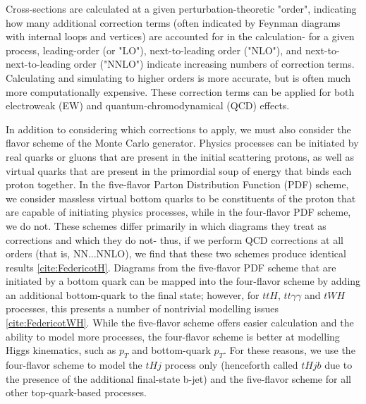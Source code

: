 Cross-sections are calculated at a given perturbation-theoretic "order", indicating how many additional correction terms (often indicated by Feynman diagrams with internal loops and vertices) are accounted for in the calculation- for a given process, leading-order (or "LO"), next-to-leading order ("NLO"), and next-to-next-to-leading order ("NNLO") indicate increasing numbers of correction terms. Calculating and simulating to higher orders is more accurate, but is often much more computationally expensive. These correction terms can be applied for both electroweak (EW) and quantum-chromodynamical (QCD) effects.

In addition to considering which corrections to apply, we must also consider the flavor scheme of the Monte Carlo generator. Physics processes can be initiated by real quarks or gluons that are present in the initial scattering protons, as well as virtual quarks that are present in the primordial soup of energy that binds each proton together. In the five-flavor Parton Distribution Function (PDF) scheme, we consider massless virtual bottom quarks to be constituents of the proton that are capable of initiating physics processes, while in the four-flavor PDF scheme, we do not. These schemes differ primarily in which diagrams they treat as corrections and which they do not- thus, if we perform QCD corrections at all orders (that is, NN...NNLO), we find that these two schemes produce identical results \ref{cite:FedericotH}. Diagrams from the five-flavor PDF scheme that are initiated by a bottom quark can be mapped into the four-flavor scheme by adding an additional bottom-quark to the final state; however, for $ttH$, $tt\gamma\gamma$ and $tWH$ processes, this presents a number of nontrivial modelling issues \ref{cite:FedericotWH}. While the five-flavor scheme offers easier calculation and the ability to model more processes, the four-flavor scheme is better at modelling Higgs kinematics, such as $p_{T}$ and bottom-quark  $p_{T}$. For these reasons, we use the four-flavor scheme to model the $tHj$ process only (henceforth called $tHjb$ due to the presence of the additional final-state b-jet) and the five-flavor scheme for all other top-quark-based processes. 

